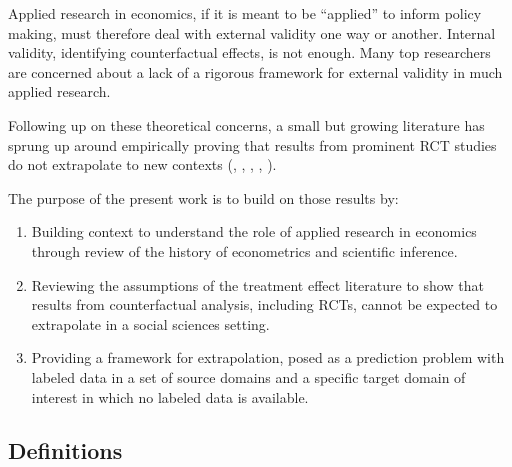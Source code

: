 \documentclass[a4paper,12pt]{article}
\begin{document}
Applied research in economics, if it is meant to be ``applied'' to inform policy making, must therefore deal with external validity one way or another. Internal validity, identifying counterfactual effects, is not enough. Many top researchers are concerned about a lack of a rigorous framework for external validity in much applied research. 


Following up on these theoretical concerns, a small but growing literature has sprung up around empirically proving that results from prominent RCT studies do not extrapolate to new contexts (\cite{LantPritchett&JustinSandefur2016}, \cite{Gechter2015}, \cite{Allcott2015}, \cite{Bisbee2017}, \cite{Rosenzweig2019}). 


The purpose of the present work is to build on those results by:

\begin{enumerate}
\item Building context to understand the role of applied research in economics through review of the history of econometrics and scientific inference.
\item Reviewing the assumptions of the treatment effect literature to show that results from counterfactual analysis, including RCTs, cannot be expected to extrapolate in a social sciences setting.  
\item Providing a framework for extrapolation, posed as a prediction problem with labeled data in a set of source domains and a specific target domain of interest in which no labeled data is available. 
\end{enumerate}



\subsection*{Definitions}
\end{document}
